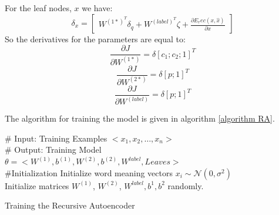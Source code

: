 \documentclass[twoside,12pt]{article}
\begin{document}
For the leaf nodes, $x$ we have:
\begin{equation}
\delta_x=
\begin{bmatrix}
W^{{(1*)}^T}\delta_q+W^{{(label)}^T}\zeta+\frac{\partial E_rec(x,\hat{x})}{\partial x}
\end{bmatrix}
\end{equation}
So the derivatives for the parameters are equal to:
\begin{equation}
\frac{\partial J}{\partial W^{(1*)}}=\delta[c_1;c_2;1]^T
\end{equation}
\begin{equation}
\frac{\partial J}{\partial W^{(2*)}}=\delta[p;1]^T
\end{equation}
\begin{equation}
\frac{\partial J}{\partial W^{(label)}}=\delta[p;1]^T
\end{equation}

The algorithm for training the model is given in algorithm \ref{algorithm RA}.

\begin{algorithm}[h!]
\# Input: Training Examples $<x_1, x_2, \ldots, x_n>$\\ 
\# Output: Training Model\\$\theta=<W^{(1)},b^{(1)},W^{(2)},b^{(2)},W^{label},Leaves>$\\ 
\#Initialization
Initialize word meaning vectors $x_i \sim \mathcal{N}(0,\sigma^2)$\\
Initialize matrices $W^{(1)}$, $W^{(2)}$, $W^{label}, b^{1},b^{2}$ randomly.\\
\caption{Training the Recursive Autoencoder}
\label{algorithm RA}
\end{algorithm}
\end{document}
